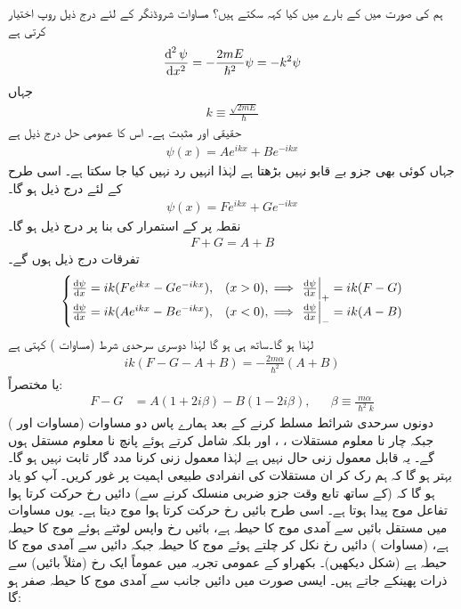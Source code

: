 ہم  کی صورت میں  کے بارے میں کیا کہہ سکتے ہیں؟ مساوات شروڈنگر  کے لئے درج ذیل روپ اختیار کرتی ہے
\begin{align*}
\frac{\dif^{\,2}\psi}{\dif x^2}=-\frac{2mE}{\hslash^2}\psi=-k^2\psi
\end{align*}
 جہاں
\begin{align}\label{مساوات_شروڈنگر_مستقل_کے}
k\equiv\frac{\sqrt{2mE}}{\hslash}
\end{align}
 حقیقی اور مثبت ہے۔ اس کا عمومی حل درج ذیل ہے
\begin{align}\label{مساوات_شروڈنگر_بایاں_حل_ڈیلٹا}
\psi(x)=Ae^{ikx}+Be^{-ikx}
\end{align}
جہاں کوئی بھی جزو بے قابو نہیں بڑھتا ہے لہٰذا انہیں رد نہیں کیا جا سکتا ہے۔ اسی طرح  کے لئے درج ذیل ہو گا۔
\begin{align}\label{مساوات_شروڈنگر_دایاں_حل_ڈیلٹا}
\psi(x)=Fe^{ikx}+Ge^{-ikx}
\end{align}
نقطہ  پر  کے استمرار کی بنا پر درج ذیل ہو گا۔
\begin{align}\label{مساوات_شروڈنگر_شرط_اول}
F+G=A+B
\end{align}
تفرقات درج ذیل ہوں گے۔
\begin{align*}
\begin{cases}
\frac{\dif\psi}{\dif x}=ik(Fe^{ikx}-Ge^{-ikx}),& (x>0),\implies \left.\frac{\dif\psi}{\dif x}\right|_{+}=ik(F-G)\\
\frac{\dif\psi}{\dif x}=ik(Ae^{ikx}-Be^{-ikx}),& (x<0),\implies \left.\frac{\dif\psi}{\dif x}\right|_{-}=ik(A-B)
\end{cases}
\end{align*}
لہٰذا  ہو گا۔ساتھ ہی  ہو گا لہٰذا دوسری سرحدی شرط (مساوات ) کہتی ہے
\begin{align}
ik(F-G-A+B)=-\frac{2m\alpha}{\hslash^2}(A+B)
\end{align}
یا مختصراً:
\begin{align}\label{مساوات_شروڈنگر_شرط_دوم}
F-G&=A(1+2i\beta)-B(1-2i\beta),&&\beta\equiv\frac{m\alpha}{\hslash^2 k}
\end{align}
دونوں سرحدی شرائط مسلط کرنے کے بعد ہمارے پاس دو مساوات (مساوات  اور ) جبکہ چار نا معلوم مستقلات ، ،  اور  بلکہ  شامل کرتے ہوئے پانچ نا معلوم مستقل ہوں گے۔ یہ قابل  معمول زنی   حال نہیں ہے لہٰذا معمول زنی کرنا   مدد گار ثابت نہیں ہو گا۔ بہتر ہو گا کہ ہم رک کر ان مستقلات کی انفرادی طبیعی اہمیت پر غور کریں۔ آپ کو یاد ہو گا کہ  (کے ساتھ تابع وقت جزو ضربی  منسلک کرنے سے) دائیں رخ حرکت کرتا ہوا تفاعل موج پیدا ہوتا ہے۔ اسی طرح  بائیں رخ حرکت کرتا ہوا موج دیتا ہے۔ یوں مساوات  میں مستقل  بائیں سے آمدی موج کا حیطہ ہے،  بائیں رخ واپس لوٹتے ہوئے موج کا حیطہ ہے،  (مساوات ) دائیں رخ نکل کر چلتے ہوئے موج کا حیطہ جبکہ  دائیں سے آمدی موج کا حیطہ ہے (شکل  دیکھیں)۔ بکھراو کے عمومی تجربہ میں عموماً ایک رخ (مثلاً بائیں) سے ذرات پھینکے جاتے ہیں۔ ایسی صورت میں دائیں جانب سے آمدی موج کا حیطہ صفر ہو گا:
